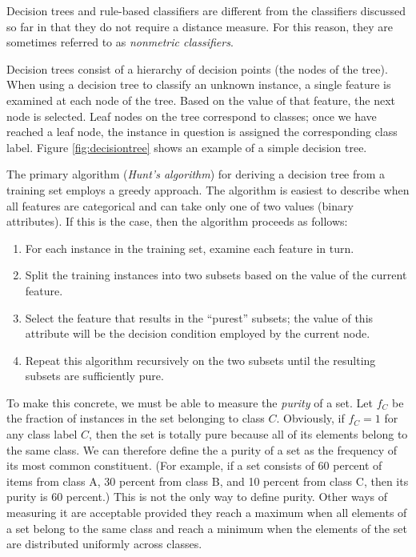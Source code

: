 
Decision trees and rule-based classifiers are different from the
classifiers discussed so far in that they do not require a distance
measure. For this reason, they are sometimes referred to as
\emph{nonmetric classifiers}.  

Decision trees consist of a hierarchy of decision points (the nodes of
the tree). When using a decision tree to  classify an unknown
instance, a single feature is examined at each node of the tree. Based
on the value of that feature, the next node is selected. Leaf nodes on
the tree correspond to classes; once we have reached a leaf node, the
instance in question is assigned the corresponding class label.
Figure \ref{fig:decisiontree} shows an example of a simple decision
tree.

 

The primary algorithm (\emph{Hunt's algorithm})  for deriving a
decision tree from a training set employs a greedy approach. The
algorithm is easiest to describe when all features are categorical and
can take only one of two values (binary attributes). If this is the
case, then the algorithm proceeds as follows:
\begin{enumerate}
\item For each instance in the training set, examine each feature in
  turn. 
\item Split the training instances into two subsets based on the
  value of the current feature. 
\item Select the feature that results in the ``purest'' subsets; the
  value of this attribute will be the decision condition employed by
  the current node.
\item Repeat this algorithm recursively on the two subsets until the
  resulting subsets are sufficiently pure.
\end{enumerate}

To make this concrete, we must be able to measure the \emph{purity} of
a set.  Let $f_C$ be the fraction of instances in the set belonging to
class $C$.  Obviously, if $f_C = 1$ for any class label $C$, then the
set is totally pure because  all of its elements belong to the same
class. We can therefore define the a purity of a set as the frequency
of its most common constituent. (For example, if a set consists of 60
percent of items from class A, 30 percent from class B, and 10 percent from
class C, then its purity is 60 percent.)  This is not the only way to
define purity. Other ways of measuring it are acceptable provided they
reach a maximum when all elements of a set belong to the same class
and reach a minimum when the elements of the set are distributed
uniformly across classes.



